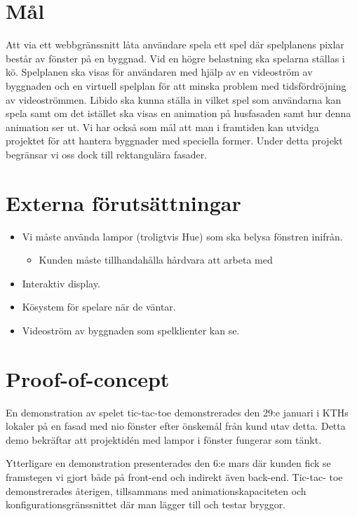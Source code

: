 \documentclass[a4paper,11pt]{article}
\begin{document}
\section{Mål}

  Att via ett webbgränssnitt låta användare spela ett spel där spelplanens
  pixlar består av fönster på en byggnad.  Vid en högre belastning ska
  spelarna ställas i kö.  Spelplanen ska visas för användaren med hjälp av en
  videoström av byggnaden och en virtuell spelplan för att minska problem med
  tidsfördröjning av videoströmmen.  Libido ska kunna ställa in vilket spel
  som användarna kan spela samt om det istället ska visas en animation på
  husfasaden samt hur denna animation ser ut.  Vi har också som mål att man i
  framtiden kan utvidga projektet för att hantera byggnader med speciella
  former.  Under detta projekt begränsar vi oss dock till rektangulära
  fasader.


\section{Externa förutsättningar}

  \begin{itemize}
    \item Vi måste använda lampor (troligtvis Hue) som ska belysa fönstren
          inifrån.
          \begin{itemize}
            \item Kunden måste tillhandahålla hårdvara att arbeta med
          \end{itemize}
    \item Interaktiv display.
    \item Kösystem för spelare när de väntar.
    \item Videoström av byggnaden som spelklienter kan se.
  \end{itemize}


\section{Proof-of-concept}

  En demonstration av spelet tic-tac-toe demonstrerades den 29:e januari i KTHs
  lokaler på en fasad med nio fönster efter önskemål från kund utav detta.
  Detta demo bekräftar att projektidén med lampor i fönster fungerar som
  tänkt.

  Ytterligare en demonstration presenterades den 6:e mars där kunden fick se
  framstegen vi gjort både på front-end och indirekt även back-end. Tic-tac-
  toe demonstrerades återigen, tillsammans med animationskapaciteten och 
  konfigurationsgränssnittet där man lägger till och testar bryggor.
\end{document}
